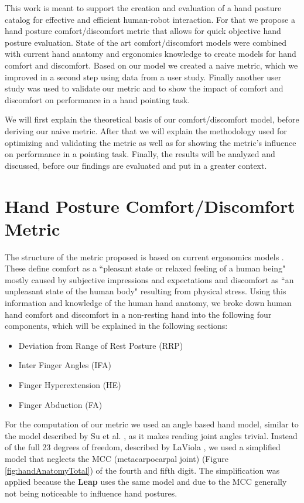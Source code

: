 \documentclass{sig-alternate-05-2015}
\begin{document}
This work is meant to support the creation and evaluation of a hand posture catalog for effective and efficient human-robot interaction. For that we propose a hand posture comfort/discomfort metric that allows for quick objective hand posture evaluation. State of the art comfort/discomfort models were combined with current hand anatomy and ergonomics knowledge to create models for hand comfort and discomfort. Based on our model we created a naive metric, which we improved in a second step using data from a user study. Finally another user study was used to validate our metric and to show the impact of comfort and discomfort on performance in a hand pointing task.

We will first explain the theoretical basis of our comfort/discomfort model, before deriving our naive metric. After that we will explain the methodology used for optimizing and validating the metric as well as for showing the metric's influence on performance in a pointing task. Finally, the results will be analyzed and discussed, before our findings are evaluated and put in a greater context.


\section{Hand Posture Comfort/Discomfort Metric}
The structure of the metric proposed is based on current ergonomics models \cite{vink2012editorial}. These define comfort as a ``pleasant state or relaxed feeling of a human being" mostly caused by subjective impressions and expectations and discomfort as ``an unpleasant state of the human body" resulting from physical stress. Using this information and knowledge of the human hand anatomy, we broke down human hand comfort and discomfort in a non-resting hand into the following four components, which will be explained in the following sections: 

\begin{itemize}
	\item Deviation from Range of Rest Posture (RRP)
	\item Inter Finger Angles (IFA)
	\item Finger Hyperextension (HE)
	\item Finger Abduction (FA)
\end{itemize}

For the computation of our metric we used an angle based hand model, similar to the model described by Su et al. \cite{su1994logical}, as it makes reading joint angles trivial. Instead of the full 23 degrees of freedom, described by LaViola \cite{laviola1999survey}, we used a simplified model that neglects the MCC (metacarpocarpal joint) (Figure \ref{fig:handAnatomyTotal}) of the fourth and fifth digit. The simplification was applied because the \textbf{Leap} uses the same model and due to the MCC generally not being noticeable to influence hand postures.
\end{document}
